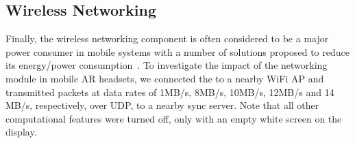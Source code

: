 %
%






\subsection{Wireless Networking}

Finally, the wireless networking component is often considered to be a major power consumer in mobile systems with a number of solutions proposed to reduce its energy/power consumption~\cite{salsa,7034998,ALI2016173}. To investigate the impact of the networking module in mobile AR headsets, we connected the {\mlo} to a nearby WiFi AP and transmitted packets at data rates of 1MB/s, 8MB/s, 10MB/s, 12MB/s and 14 MB/s, respectively, over UDP, to a nearby sync server. Note that all other computational features were turned off, only with an empty white screen on the display. 


